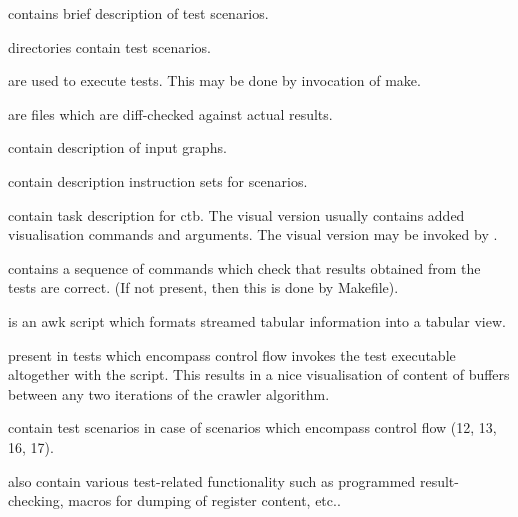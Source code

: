 \begin{description}
  \item {} contains brief description of test scenarios.
  \item {} directories contain test scenarios.
  \item {} are used to execute tests. This may be done by invocation of make.
  \item {} are files which are diff-checked against actual results.
  \item {} contain description of input graphs.
  \item {} contain description instruction sets for scenarios. 
  \item {} contain task description for ctb. The visual version usually contains added visualisation commands and arguments. The visual version may be invoked by .
  \item {} contains a sequence of commands which check that results obtained from the tests are correct. (If not present, then this is done by Makefile).
  \item {} is an awk script which formats streamed tabular information into a tabular view. 
  \item {} present in tests which encompass control flow invokes the test executable altogether with the  script. This results in a nice visualisation of content of buffers between any two iterations of the crawler algorithm.
  \item {} contain test scenarios in case of scenarios which encompass control flow (12, 13, 16, 17).
  \item {} also contain various test-related functionality such as programmed result-checking, macros for dumping of register content, etc..
\end{description}

